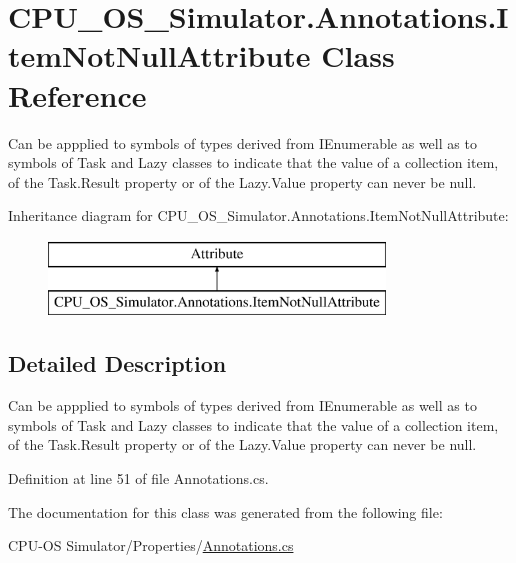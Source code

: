 \hypertarget{class_c_p_u___o_s___simulator_1_1_annotations_1_1_item_not_null_attribute}{}\section{C\+P\+U\+\_\+\+O\+S\+\_\+\+Simulator.\+Annotations.\+Item\+Not\+Null\+Attribute Class Reference}
\label{class_c_p_u___o_s___simulator_1_1_annotations_1_1_item_not_null_attribute}


Can be appplied to symbols of types derived from I\+Enumerable as well as to symbols of Task and Lazy classes to indicate that the value of a collection item, of the Task.\+Result property or of the Lazy.\+Value property can never be null.  


Inheritance diagram for C\+P\+U\+\_\+\+O\+S\+\_\+\+Simulator.\+Annotations.\+Item\+Not\+Null\+Attribute\+:\begin{figure}[H]
\begin{center}
\leavevmode
\includegraphics[height=2.000000cm]{class_c_p_u___o_s___simulator_1_1_annotations_1_1_item_not_null_attribute}
\end{center}
\end{figure}


\subsection{Detailed Description}
Can be appplied to symbols of types derived from I\+Enumerable as well as to symbols of Task and Lazy classes to indicate that the value of a collection item, of the Task.\+Result property or of the Lazy.\+Value property can never be null. 



Definition at line 51 of file Annotations.\+cs.



The documentation for this class was generated from the following file\+:\begin{DoxyCompactItemize}
\item 
C\+P\+U-\/\+O\+S Simulator/\+Properties/\hyperlink{_annotations_8cs}{Annotations.\+cs}\end{DoxyCompactItemize}

